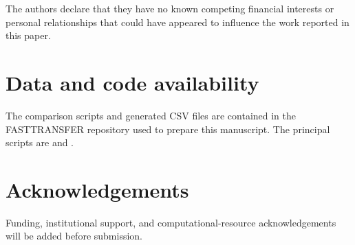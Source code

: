 \documentclass[a4paper,fleqn]{cas-sc}
\begin{document}
The authors declare that they have no known competing financial interests or personal relationships that could have appeared to influence the work reported in this paper.

\section*{Data and code availability}

The comparison scripts and generated CSV files are contained in the FASTTRANSFER repository used to prepare this manuscript. The principal scripts are  and .

\section*{Acknowledgements}

Funding, institutional support, and computational-resource acknowledgements will be added before submission.



\end{document}
